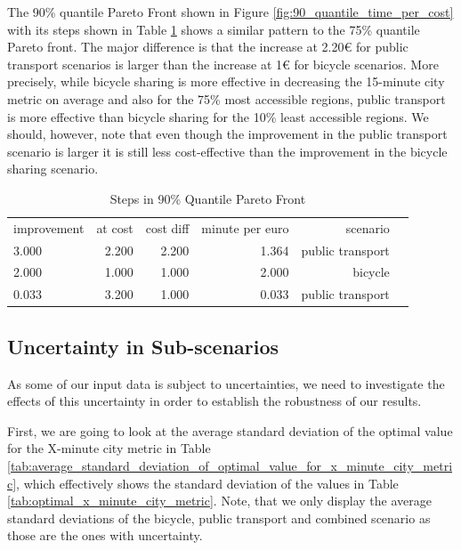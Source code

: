The 90\% quantile Pareto Front shown in Figure \ref{fig:90_quantile_time_per_cost} with its steps shown in Table \ref{tab:differences_in_90_quantile_pareto_front} shows a similar pattern to the 75\% quantile Pareto front.
The major difference is that the increase at 2.20€ for public transport scenarios is larger than the increase at 1€ for bicycle scenarios.
More precisely, while bicycle sharing is more effective in decreasing the 15-minute city metric on average and also for the 75\% most accessible regions, public transport is more effective than bicycle sharing for the 10\% least accessible regions.
We should, however, note that even though the improvement in the public transport scenario is larger it is still less cost-effective than the improvement in the bicycle sharing scenario.


\begin{table}
  \caption{Steps in 90\% Quantile Pareto Front}
  \label{tab:differences_in_90_quantile_pareto_front}
  \begin{center}
    \begin{tabular}{lrrrrl}
     improvement & at cost & cost diff & minute per euro & scenario \\
     3.000 & 2.200 & 2.200 & 1.364 & public transport \\
     2.000 & 1.000 & 1.000 & 2.000 & bicycle \\
     0.033 & 3.200 & 1.000 & 0.033 & public transport \\
    \end{tabular}
  \end{center}
\end{table}


\subsection{Uncertainty in Sub-scenarios}
\label{subsec:uncertainty_subscenarios}

As some of our input data is subject to uncertainties, we need to investigate the effects of this uncertainty in order to establish the robustness of our results.

First, we are going to look at the average standard deviation of the optimal value for the X-minute city metric in Table \ref{tab:average_standard_deviation_of_optimal_value_for_x_minute_city_metric}, which effectively shows the standard deviation of the values in Table \ref{tab:optimal_x_minute_city_metric}.
Note, that we only display the average standard deviations of the bicycle, public transport and combined scenario as those are the ones with uncertainty.

